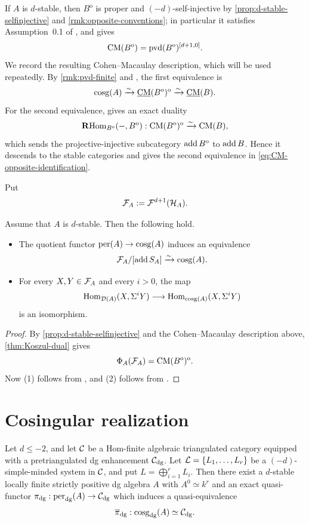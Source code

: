 \documentclass[11pt,a4paper,dvipsnames,x11names]{amsart}
\begin{document}
If $A$ is $d$-stable, then $B^{\mathrm{o}}$ is proper and $(-d)$-self-injective by \cref{prop:d-stable-selfinjective} and \cref{rmk:opposite-conventions}; in particular it satisfies Assumption~0.1 of \cite{Jin20}, and \cite[Proposition~2.3]{Jin20} gives
\[
\operatorname{CM}(B^{\mathrm{o}})=\operatorname{pvd}(B^{\mathrm{o}})^{[d+1,0]}.
\]
We record the resulting Cohen--Macaulay description, which will be used repeatedly. By \cref{rmk:pvd-finite} and \cite[Theorem~2.4]{Jin20}, the first equivalence is
\begin{equation}\label{eq:CM-opposite-identification}
\operatorname{cosg}(A)\xrightarrow{\sim}\underline{\operatorname{CM}}(B^{\mathrm{o}})^{\mathrm{o}}
\xrightarrow{\sim}\underline{\operatorname{CM}}(B).
\end{equation}
For the second equivalence, \cite[Proposition~2.6]{Jin20} gives an exact duality
\[
\operatorname{\mathbf{R}Hom}_{B^{\mathrm{o}}}(-,B^{\mathrm{o}}):
\operatorname{CM}(B^{\mathrm{o}})^{\mathrm{o}}\xrightarrow{\sim}\operatorname{CM}(B),
\]
which sends the projective-injective subcategory $\operatorname{add} B^{\mathrm{o}}$ to $\operatorname{add} B$. Hence it descends to the stable categories and gives the second equivalence in \eqref{eq:CM-opposite-identification}.

Put
\[
\mathcal F_A:=\mathcal F^{d+1}(\mathcal H_A).
\]

\begin{prop}\label{prop:fundamental-domain}
Assume that $A$ is $d$-stable.
Then the following hold.
\begin{itemize}
\item [(1)] The quotient functor $\operatorname{per}(A)\to\operatorname{cosg}(A)$ induces an equivalence
\[
\mathcal F_A/[\operatorname{add} S_A]\xrightarrow{\sim}\operatorname{cosg}(A).
\]
\item [(2)] For every $X,Y\in\mathcal F_A$ and every $i>0$, the map
\[
\operatorname{Hom}_{\mathcal D(A)}(X,\Sigma^iY)\longrightarrow\operatorname{Hom}_{\operatorname{cosg}(A)}(X,\Sigma^iY)
\]
is an isomorphism.
\end{itemize}
\end{prop}
\begin{proof}
By \cref{prop:d-stable-selfinjective} and the Cohen--Macaulay description above, \cref{thm:Koszul-dual} gives
\[
\Phi_A(\mathcal F_A)=\operatorname{CM}(B^{\mathrm{o}})^{\mathrm{o}}.
\]
Now (1) follows from \cite[Theorem~2.4]{Jin20}, and (2) follows from \cite[Proposition~2.6]{Jin20}.
\end{proof}



\section{Cosingular realization}\label{sec:cosingular-realization}
\begin{thm}\label{thm:realization}
Let $d\leq-2$, and let $\mathcal C$ be a Hom-finite algebraic triangulated category equipped with a pretriangulated dg enhancement $\mathcal C_{\mathrm{dg}}$. Let $\mathcal L=\{L_1,\dots,L_r\}$ be a $(-d)$-simple-minded system in $\mathcal C$, and put $L=\bigoplus_{i=1}^rL_i$. Then there exist a $d$-stable locally finite strictly positive dg algebra $A$ with $A^0\simeq k^r$ and an exact quasi-functor $\pi_{\mathrm{dg}}:\operatorname{per}_{\mathrm{dg}}(A)\to\mathcal C_{\mathrm{dg}}$ which induces a quasi-equivalence
\[
\overline\pi_{\mathrm{dg}}:\operatorname{cosg}_{\mathrm{dg}}(A)\simeq\mathcal C_{\mathrm{dg}}.
\]
\end{thm}
\end{document}
